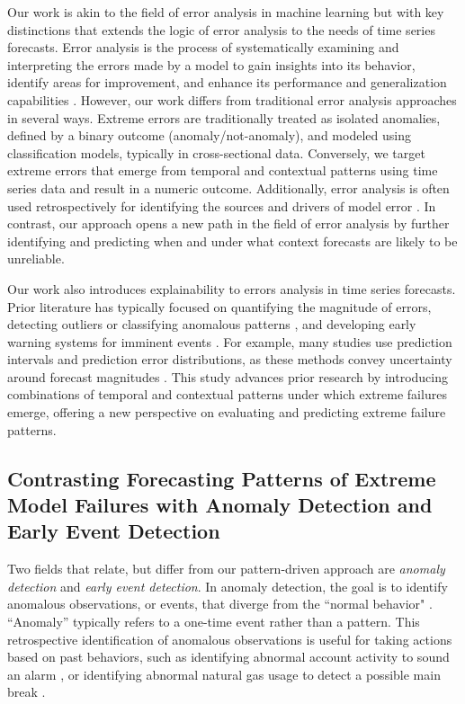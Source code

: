 \documentclass[ijds,sglanonrev]{informs4}
\begin{document}
Our work is akin to the field of error analysis in machine learning but with key distinctions that extends the logic of error analysis to the needs of time series forecasts. Error analysis is the process of systematically examining and interpreting the errors made by a model to gain insights into its behavior, identify areas for improvement, and enhance its performance and generalization capabilities \citep{cakmak2024}. However, our work differs from traditional error analysis approaches in several ways. Extreme errors are traditionally treated as isolated anomalies, defined by a binary outcome (anomaly/not-anomaly), and modeled using classification models, typically in cross-sectional data. Conversely, we target extreme errors that emerge from temporal and contextual patterns using time series data and result in a numeric outcome. Additionally, error analysis is often used retrospectively for identifying the sources and drivers of model error \citep{cakmak2024}. In contrast, our approach opens a new path in the field of error analysis by further identifying and predicting when and under what context forecasts are likely to be unreliable. 

Our work also introduces explainability to errors analysis in time series forecasts. Prior literature has typically focused on quantifying the magnitude of errors, detecting outliers or classifying anomalous patterns \citep{chen2008, kim2020}, and developing early warning systems for imminent events \citep[e.g.,][]{shmueli2010}. For example, many studies use prediction intervals and prediction error distributions, as these methods convey uncertainty around forecast magnitudes \citep{aguirre2018, salem2020}. This study advances prior research by introducing combinations of temporal and contextual patterns under which extreme failures emerge, offering a new perspective on evaluating and predicting extreme failure patterns.

\subsection{Contrasting Forecasting Patterns of Extreme Model Failures with Anomaly Detection and Early Event Detection}\label{sec-contrasting}

Two fields that relate, but differ from our pattern-driven approach are \emph{anomaly detection} and \emph{early event detection}. In anomaly detection, the goal is to identify anomalous observations, or events, that diverge from the ``normal behavior" \citep{chandola2009, nassif2021}. ``Anomaly'' typically refers to a one-time event rather than a pattern. This retrospective identification of anomalous observations is useful for taking actions based on past behaviors, such as identifying abnormal account activity to sound an alarm \citep{patcha2007}, or identifying abnormal natural gas usage to detect a possible main break \citep{akouemo2016}.
\end{document}
